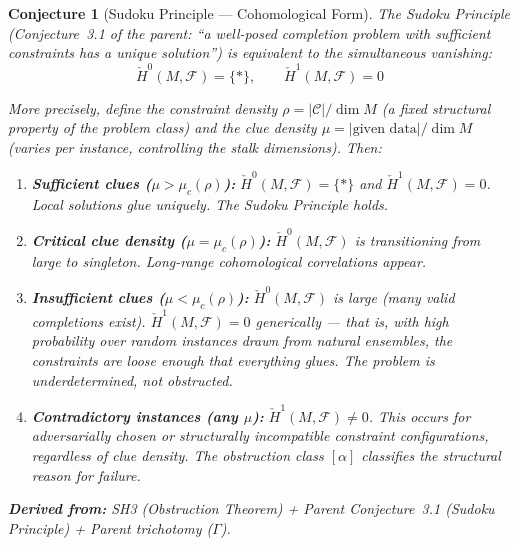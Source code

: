 \documentclass[11pt,letterpaper]{article}
\newtheorem{conjecture}{Conjecture}[section]
\newcommand{\Hcech}{\check{H}}
\newcommand{\sheaf}{\mathcal{F}}
\newcommand{\constraint}{\mathcal{C}}
\begin{document}
\begin{conjecture}[Sudoku Principle --- Cohomological 
Form]\label{conj:sudoku}
The Sudoku Principle (Conjecture~3.1 of the parent: ``a well-posed 
completion problem with sufficient constraints has a unique solution'') 
is equivalent to the simultaneous vanishing:
\begin{equation}\label{eq:sudoku_cohomological}
    \Hcech^0(M, \sheaf) = \{*\}, \qquad 
    \Hcech^1(M, \sheaf) = 0
\end{equation}

More precisely, define the \emph{constraint density} $\rho = 
|\constraint| / \dim M$ (a fixed structural property of the problem 
class) and the \emph{clue density} $\mu = |\text{given data}| / 
\dim M$ (varies per instance, controlling the stalk dimensions). Then:

\begin{enumerate}[label=(\alph*)]
    \item \textbf{Sufficient clues 
    ($\mu > \mu_c(\rho)$):} $\Hcech^0(M, \sheaf) = \{*\}$ and 
    $\Hcech^1(M, \sheaf) = 0$. Local solutions glue uniquely. The 
    Sudoku Principle holds.
    
    \item \textbf{Critical clue density ($\mu = \mu_c(\rho)$):} 
    $\Hcech^0(M, \sheaf)$ is transitioning from large to singleton. 
    Long-range cohomological correlations appear.
    
    \item \textbf{Insufficient clues ($\mu < \mu_c(\rho)$):} 
    $\Hcech^0(M, \sheaf)$ is large (many valid completions exist). 
    $\Hcech^1(M, \sheaf) = 0$ generically --- that is, with high 
    probability over random instances drawn from natural ensembles, 
    the constraints are loose enough that everything glues. The problem 
    is \emph{underdetermined}, not obstructed.
    
    \item \textbf{Contradictory instances (any $\mu$):} 
    $\Hcech^1(M, \sheaf) \neq 0$. This occurs for adversarially chosen 
    or structurally incompatible constraint configurations, regardless 
    of clue density. The obstruction class $[\alpha]$ classifies the 
    structural reason for failure.
\end{enumerate}

\textbf{Derived from:} SH3 (Obstruction Theorem) + Parent 
Conjecture~3.1 (Sudoku Principle) + Parent trichotomy ($\Gamma$).


\end{conjecture}
\end{document}
